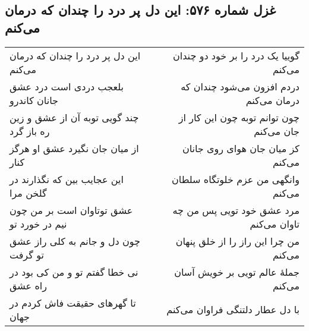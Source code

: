 \begin{center}
\section*{غزل شماره ۵۷۶: این دل پر درد را چندان که درمان می‌کنم}
\label{sec:576}
\begin{longtable}{l p{0.5cm} r}
این دل پر درد را چندان که درمان می‌کنم
&&
گوییا یک درد را بر خود دو چندان می‌کنم
\\
بلعجب دردی است درد عشق جانان کاندرو
&&
دردم افزون می‌شود چندان که درمان می‌کنم
\\
چند گویی توبه آن از عشق و زین ره باز گرد
&&
چون توانم توبه چون این کار از جان می‌کنم
\\
از میان جان نگیرد عشق او هرگز کنار
&&
کز میان جان هوای روی جانان می‌کنم
\\
این عجایب بین که نگذارند در گلخن مرا
&&
وانگهی من عزم خلوتگاه سلطان می‌کنم
\\
عشق توتاوان است بر من چون نیم در خورد تو
&&
مرد عشق خود تویی پس من چه تاوان می‌کنم
\\
چون دل و جانم به کلی راز عشق تو گرفت
&&
من چرا این راز را از خلق پنهان می‌کنم
\\
نی خطا گفتم تو و من کی بود در راه عشق
&&
جملهٔ عالم تویی بر خویش آسان می‌کنم
\\
تا گهرهای حقیقت فاش کردم در جهان
&&
با دل عطار دلتنگی فراوان می‌کنم
\\
\end{longtable}
\end{center}

